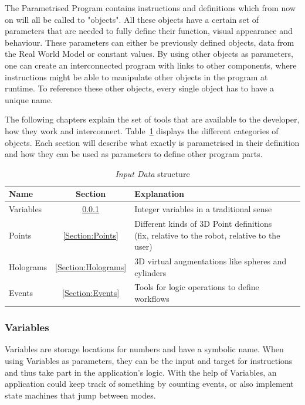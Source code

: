 The Parametrised Program contains instructions and definitions which from now on will all be called to "objects". All these objects have a certain set of parameters that are needed to fully define their function, visual appearance and behaviour. These parameters can either be previously defined objects, data from the Real World Model or constant values. By using other objects as parameters, one can create an interconnected program with links to other components, where instructions might be able to manipulate other objects in the program at runtime. To reference these other objects, every single object has to have a unique name.

The following chapters explain the set of tools that are available to the developer, how they work and interconnect. Table~\ref{Table:InputDataStructure} displays the different categories of objects. Each section will describe what exactly is parametrised in their definition and how they can be used as parameters to define other program parts.

\begin{table}[ht]
	\caption{\textit{Input Data} structure}
	\label{Table:InputDataStructure}
	\centering
	\begin{tabular}{lcl}
		\toprule
		Name & Section		& Explanation	\\		
		\midrule
		Variables & \ref{Section:Variables}		& Integer variables in a traditional sense \\
		Points& \ref{Section:Points}		& \parbox[t]{10cm}{Different kinds of 3D Point definitions\\(fix, relative to the robot, relative to the user)} 	 \\
		Holograms& \ref{Section:Holograms} & 3D virtual augmentations like spheres and cylinders\\
		Events& \ref{Section:Events} & Tools for logic operations to define workflows \\
		\bottomrule
	\end{tabular}
\end{table}

\subsubsection{Variables}\label{Section:Variables}
Variables are storage locations for numbers and have a symbolic name. When using Variables as parameters, they can be the input and target for instructions and thus take part in the application's logic. With the help of Variables, an application could keep track of something by counting events, or also implement state machines that jump between modes.

